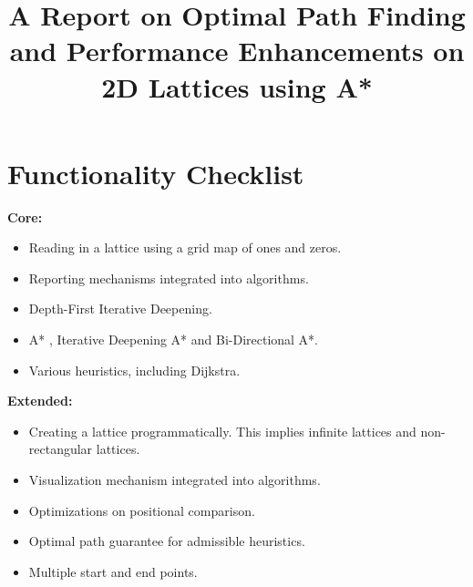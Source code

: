 \documentclass[conference]{IEEEtran}
\begin{document}
\title{A Report on Optimal Path Finding and Performance Enhancements on 2D Lattices using A*}

\author{
}

\maketitle

\section{Functionality Checklist}
\textbf{Core:}
\begin{itemize}
    \item Reading in a lattice using a grid map of ones and zeros.
    \item Reporting mechanisms integrated into algorithms.
    \item Depth-First Iterative Deepening.
    \item A* , Iterative Deepening A* and Bi-Directional A*.
    \item Various heuristics, including Dijkstra.
\end{itemize}

\textbf{Extended:}
\begin{itemize}
    \item Creating a lattice programmatically. This implies infinite lattices and non-rectangular lattices.
    \item Visualization mechanism integrated into algorithms.
    \item Optimizations on positional comparison.
    \item Optimal path guarantee for admissible heuristics.
    \item Multiple start and end points.
\end{itemize}
\end{document}
